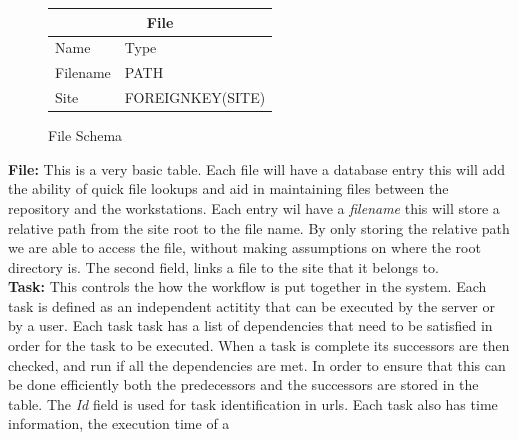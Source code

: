 \documentclass[12pt,a4paper]{report}
\begin{document}
\begin{figure}
\begin{tabular}{l|l}
    \multicolumn{2}{c}{File} \\
    \hline
    Name        & Type \\
    \hline
    Filename    & PATH  \\
    Site        & FOREIGNKEY(SITE)  \\
\end{tabular}
\caption{File Schema}
\end{figure}
\noindent\textbf{File:} This is a very basic table. Each file will have a database entry
this will add the ability of quick file lookups and aid in maintaining files between the
repository and the workstations. Each entry wil have a \emph{filename} this will store
a relative path from the site root to the file name. By only storing the relative path
we are able to access the file, without making assumptions on where the root directory
is. The second field, links a file to the site that it belongs to.
\\

\noindent \textbf{Task:} This controls the how the workflow is put together in the system.
Each task is defined as an independent actitity that can be executed by the server or
by a user. Each task task has a list of dependencies that need to be satisfied in order
for the task to be executed. When a task is complete its successors are then checked,
and run if all the dependencies are met. In order to ensure that this can be done efficiently
both the predecessors and the successors are stored in the table. The \emph{Id} field is
used for task identification in urls. Each task also has time information, the execution
time of a
\end{document}
